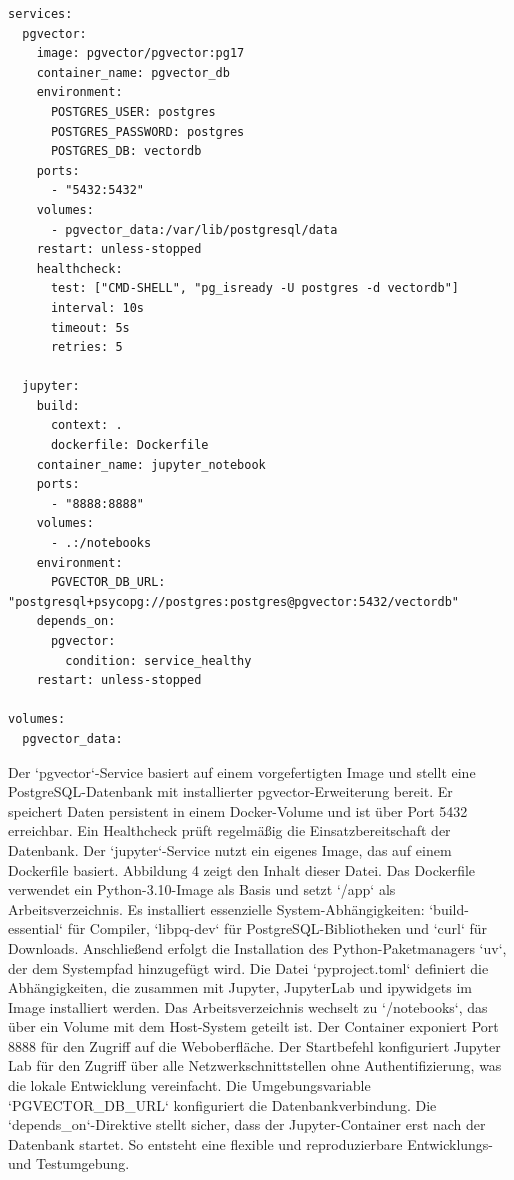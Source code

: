 \begin{lstlisting}[caption={Docker Compose Konfiguration für PGVector und Jupyter}, label={lst:docker-compose}]
services:
  pgvector:
    image: pgvector/pgvector:pg17
    container_name: pgvector_db
    environment:
      POSTGRES_USER: postgres
      POSTGRES_PASSWORD: postgres
      POSTGRES_DB: vectordb
    ports:
      - "5432:5432"
    volumes:
      - pgvector_data:/var/lib/postgresql/data
    restart: unless-stopped
    healthcheck:
      test: ["CMD-SHELL", "pg_isready -U postgres -d vectordb"]
      interval: 10s
      timeout: 5s
      retries: 5

  jupyter:
    build:
      context: .
      dockerfile: Dockerfile
    container_name: jupyter_notebook
    ports:
      - "8888:8888"
    volumes:
      - .:/notebooks
    environment:
      PGVECTOR_DB_URL: "postgresql+psycopg://postgres:postgres@pgvector:5432/vectordb"
    depends_on:
      pgvector:
        condition: service_healthy
    restart: unless-stopped

volumes:
  pgvector_data:
\end{lstlisting}

Der `pgvector`-Service basiert auf einem vorgefertigten Image und stellt eine PostgreSQL-Datenbank mit installierter pgvector-Erweiterung bereit. Er speichert Daten persistent in einem Docker-Volume und ist über Port 5432 erreichbar. Ein Healthcheck prüft regelmäßig die Einsatzbereitschaft der Datenbank.
Der `jupyter`-Service nutzt ein eigenes Image, das auf einem Dockerfile basiert. Abbildung 4 zeigt den Inhalt dieser Datei. Das Dockerfile verwendet ein Python-3.10-Image als Basis und setzt `/app` als Arbeitsverzeichnis. Es installiert essenzielle System-Abhängigkeiten: `build-essential` für Compiler, `libpq-dev` für PostgreSQL-Bibliotheken und `curl` für Downloads. Anschließend erfolgt die Installation des Python-Paketmanagers `uv`, der dem Systempfad hinzugefügt wird. Die Datei `pyproject.toml` definiert die Abhängigkeiten, die zusammen mit Jupyter, JupyterLab und ipywidgets im Image installiert werden. Das Arbeitsverzeichnis wechselt zu `/notebooks`, das über ein Volume mit dem Host-System geteilt ist. Der Container exponiert Port 8888 für den Zugriff auf die Weboberfläche. Der Startbefehl konfiguriert Jupyter Lab für den Zugriff über alle Netzwerkschnittstellen ohne Authentifizierung, was die lokale Entwicklung vereinfacht. Die Umgebungsvariable `PGVECTOR\_DB\_URL` konfiguriert die Datenbankverbindung. Die `depends\_on`-Direktive stellt sicher, dass der Jupyter-Container erst nach der Datenbank startet. So entsteht eine flexible und reproduzierbare Entwicklungs- und Testumgebung.


